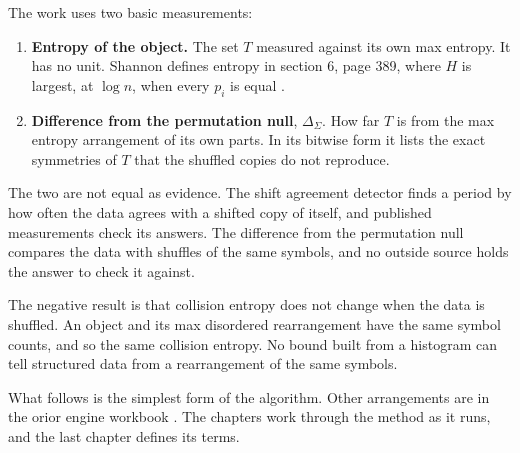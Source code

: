 The work uses two basic measurements:

\begin{enumerate}
  \item \textbf{Entropy of the object.} The set \(T\) measured against its own max entropy. It
    has no unit. Shannon defines entropy in section 6, page 389, where \(H\) is largest, at
    \(\log n\), when every \(p_i\) is equal \cite{src:Shannon}.
  \item \textbf{Difference from the permutation null}, \(\Delta_{\Sigma}\). How far \(T\) is from the
    max entropy arrangement of its own parts. In its bitwise form it lists the exact symmetries
    of \(T\) that the shuffled copies do not reproduce.
\end{enumerate}

The two are not equal as evidence. The shift agreement detector finds a period by how often the data
agrees with a shifted copy of itself, and published measurements check its answers. The difference
from the permutation null compares the data with shuffles of the same symbols, and no outside source
holds the answer to check it against.

The negative result is that collision entropy does not change when the data is shuffled. An object
and its max disordered rearrangement have the same symbol counts, and so the same collision entropy.
No bound built from a histogram can tell structured data from a rearrangement of the same symbols.

What follows is the simplest form of the algorithm. Other arrangements are in the orior engine
workbook \cite{src:Quigg-orior-workbook}. The chapters work through the method as it runs, and the
last chapter defines its terms.
\cleardoublepage
